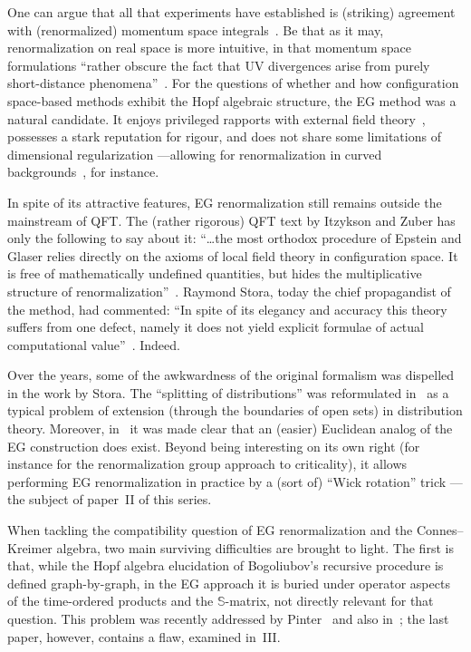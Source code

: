 \documentclass[a4paper,12pt]{article}
\newcommand{\Sf}{\mathbb{S}}       %
\newcommand{\7}{\dagger}           %
\theoremstyle{plain}
\theoremstyle{definition}
\begin{document}
One can argue that all that experiments have established is (striking)
agreement with (renormalized) momentum space
integrals~\cite{Martinus}. Be that as it may, renormalization on real
space is more intuitive, in that momentum space formulations ``rather
obscure the fact that UV divergences arise from purely short-distance
phenomena''~\cite{Collins}. For the questions of whether and how
configuration space-based methods exhibit the Hopf algebraic
structure, the EG method was a natural candidate. It enjoys privileged
rapports with external field
theory~\cite{HeidelbergTrier,Bellissard,Halley}, possesses a stark
reputation for rigour, and does not share some limitations of
dimensional regularization ---allowing for renormalization in curved
backgrounds~\cite{BrFr}, for instance.

In spite of its attractive features, EG renormalization still remains
outside the mainstream of QFT. The (rather rigorous) QFT text by
Itzykson and Zuber has only the following to say about it: ``\dots the
most orthodox procedure of Epstein and Glaser relies directly on the
axioms of local field theory in configuration space. It is free of
mathematically undefined quantities, but hides the multiplicative
structure of renormalization''~\cite[p.~374]{IZ}. Raymond Stora, today
the chief propagandist of the method, had commented: ``In spite of its
elegancy and accuracy this theory suffers from one defect, namely it
does not yield explicit formulae of actual computational
value''~\cite{LagrSt}. Indeed.

Over the years, some of the awkwardness of the original formalism was
dispelled in the work by Stora. The ``splitting of distributions'' was
reformulated in~\cite{PoSt} as a typical problem of extension (through
the boundaries of open sets) in distribution theory. Moreover,
in~\cite{EllipticSt} it was made clear that an (easier) Euclidean
analog of the EG construction does exist. Beyond being interesting on
its own right (for instance for the renormalization group approach to
criticality), it allows performing EG renormalization in practice by a
(sort of) ``Wick rotation'' trick ---the subject of paper~II of this
series.

\smallskip

When tackling the compatibility question of EG renormalization and the
Connes--Kreimer algebra, two main surviving difficulties are brought
to light. The first is that, while the Hopf algebra elucidation of
Bogoliubov's recursive procedure is defined graph-by-graph, in the EG
approach it is buried under operator aspects of the time-ordered
products and the $\Sf$-matrix, not directly relevant for that
question. This problem was recently addressed by
Pinter~\cite{Gudrunpaper,Gudrun} and also in~\cite{Etoile}; the last
paper, however, contains a flaw, examined in~III.
\end{document}
